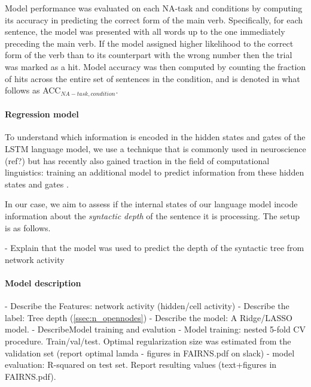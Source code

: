 Model performance was evaluated on each NA-task and conditions by computing its accuracy in predicting the correct form of the main verb. Specifically, for each sentence, the model was presented with all words up to the one immediately preceding the main verb. If the model assigned higher likelihood to the correct form of the verb than to its counterpart with the wrong number then the trial was marked as a hit. Model accuracy was then computed by counting the fraction of hits across the entire set of sentences in the condition, and is denoted in what follows as ACC$_{NA-task, condition}$.


\paragraph{Regression model}\label{ssec:dc}  To understand which
information is encoded in the hidden states and gates of the LSTM
language model, we use a technique that is commonly used in
neuroscience (ref?) but has recently also gained traction in the field
of computational linguistics: training an additional model to predict
information from these hidden states and gates
\cite{Adi:etal:2017,Hupkes:etal:2017}.

In our case, we aim to assess if the internal states of our language model incode information about the \textit{syntactic depth} of the sentence it is processing.
The setup is as follows.

- Explain that the model was used to predict the depth of the syntactic tree from network activity
\paragraph{Model description}
- Describe the Features: network activity (hidden/cell activity)
- Describe the label: Tree depth (\ref{ssec:n_opennodes})
- Describe the model: A Ridge/LASSO model.
- Describe{Model training and evalution}
- Model training: nested 5-fold CV procedure. Train/val/test. Optimal regularization size was estimated from the validation set (report optimal lamda - figures in FAIRNS.pdf on slack)
- model evaluation: R-squared on test set. Report resulting values (text+figures in FAIRNS.pdf). 


